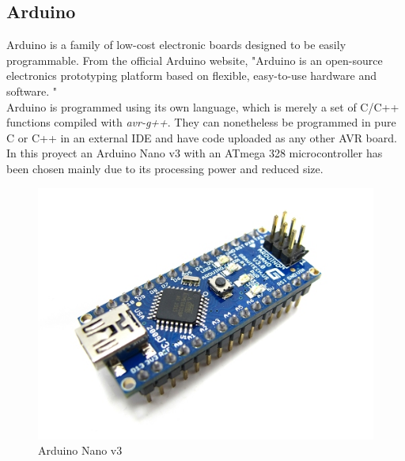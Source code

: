 \newpage
\subsection{Arduino}

	Arduino is a family of low-cost electronic boards designed to be easily programmable. From the official Arduino website, "Arduino is an open-source electronics prototyping platform based on flexible, easy-to-use hardware and software. "\\

	Arduino is programmed using its own language, which is merely a set of C/C++ functions compiled with \textit{avr-g++}. They can nonetheless be programmed in pure C or C++ in an external IDE and have code uploaded as any other AVR board.\\

	In this proyect an Arduino Nano v3 with an ATmega 328 microcontroller has been chosen mainly due to its processing power and reduced size.
		
		\begin{figure}[H]
			\centering
			\includegraphics[scale=0.4]{images/ProjectComponents/arduino.jpg}
			\caption{Arduino Nano v3 }
			\label{}
		\end{figure}
		\bigskip

